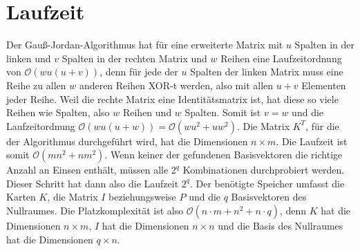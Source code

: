 \documentclass[a4paper,10pt,ngerman]{scrartcl}
\begin{document}
\section{Laufzeit}
Der Gauß-Jordan-Algorithmus hat für eine erweiterte Matrix mit $u$ Spalten in der linken und $v$ Spalten in der rechten Matrix und $w$ Reihen eine Laufzeitordnung von $\mathcal{O}(wu(u+v))$, denn für jede der $u$ Spalten der linken Matrix muss eine Reihe zu allen $w$ anderen Reihen XOR-t werden, also mit allen $u+v$ Elementen jeder Reihe. Weil die rechte Matrix eine Identitätsmatrix ist, hat diese so viele Reihen wie Spalten, also $w$ Reihen und $w$ Spalten. Somit ist $v=w$ und die Laufzeitordnung $\mathcal{O}(wu(u+w))=\mathcal{O}(wu^2+uw^2)$. Die Matrix $K^T$, für die der Algorithmus durchgeführt wird, hat die Dimensionen $n \times m$. Die Laufzeit ist somit $\mathcal{O}(mn^2+nm^2)$. Wenn keiner der gefundenen Basisvektoren die richtige Anzahl an Einsen enthält, müssen alle $2^q$ Kombinationen durchprobiert werden. Dieser Schritt hat dann also die Laufzeit $2^q$.
Der benötigte Speicher umfasst die Karten $K$, die Matrix $I$ beziehungsweise $P$ und die $q$ Basisvektoren des Nullraumes. Die Platzkomplexität ist also $\mathcal{O}(n \cdot m + n^2 + n \cdot q)$, denn $K$ hat die Dimensionen $n \times m$, $I$ hat die Dimensionen $n \times n$ und die Basis des Nullraumes hat die Dimensionen $q \times n$. 
\end{document}
